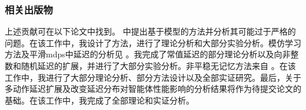 \subsubsection{相关出版物}

上述贡献可在以下论文中找到。\cite{liotet2021learning} 中提出基于模型的方法并分析其可能过于严格的问题。在该工作中，我设计了方法，进行了理论分析和大部分实验分析。模仿学习方法及平滑\glspl{mdp}中延迟的分析见 \cite{liotet2022delayed}。我完成了常值延迟的部分理论分析以及向非整数和随机延迟的扩展，并进行了大部分实验分析。非平稳无记忆方法来自 \cite{liotet2022lifelong}。在该工作中，我进行了大部分理论分析、部分方法设计以及全部实证研究。最后，关于多动作延迟扩展及改变延迟分布对智能体性能影响的分析结果将作为待提交论文的基础。在该工作中，我完成了全部理论和实证分析。
